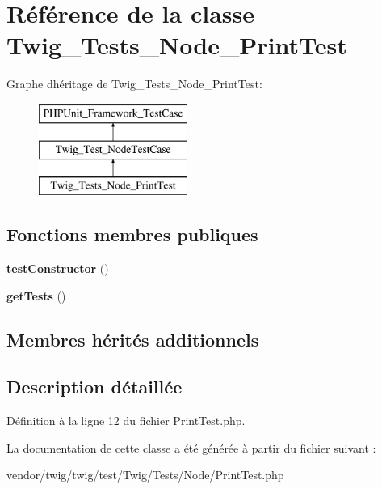 \hypertarget{class_twig___tests___node___print_test}{}\section{Référence de la classe Twig\+\_\+\+Tests\+\_\+\+Node\+\_\+\+Print\+Test}
\label{class_twig___tests___node___print_test}
Graphe d\textquotesingle{}héritage de Twig\+\_\+\+Tests\+\_\+\+Node\+\_\+\+Print\+Test\+:\begin{figure}[H]
\begin{center}
\leavevmode
\includegraphics[height=3.000000cm]{class_twig___tests___node___print_test}
\end{center}
\end{figure}
\subsection*{Fonctions membres publiques}
\begin{DoxyCompactItemize}
\item 
{\bfseries test\+Constructor} ()\hypertarget{class_twig___tests___node___print_test_a47094dc941e72950570900d1418f89c6}{}\label{class_twig___tests___node___print_test_a47094dc941e72950570900d1418f89c6}

\item 
{\bfseries get\+Tests} ()\hypertarget{class_twig___tests___node___print_test_a7e247dd31cc8d37a6c97353a062a0080}{}\label{class_twig___tests___node___print_test_a7e247dd31cc8d37a6c97353a062a0080}

\end{DoxyCompactItemize}
\subsection*{Membres hérités additionnels}


\subsection{Description détaillée}


Définition à la ligne 12 du fichier Print\+Test.\+php.



La documentation de cette classe a été générée à partir du fichier suivant \+:\begin{DoxyCompactItemize}
\item 
vendor/twig/twig/test/\+Twig/\+Tests/\+Node/Print\+Test.\+php\end{DoxyCompactItemize}
